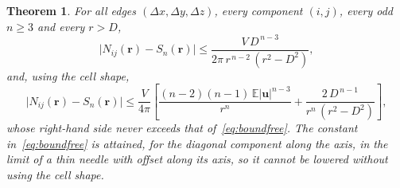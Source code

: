\documentclass[11pt]{amsart}
\theoremstyle{plain}
\newtheorem{theorem}{Theorem}[section]
\theoremstyle{definition}
\theoremstyle{remark}
\begin{document}
\begin{theorem}\label{thm:bound}
For all edges $(\Delta x,\Delta y,\Delta z)$, every component $(i,j)$, every odd
$n\ge 3$ and every $r>D$,
\begin{equation}
  \big|N_{ij}(\mathbf r)-S_n(\mathbf r)\big|
  \le \frac{V\,D^{\,n-3}}{2\pi\, r^{\,n-2}\,(r^2-D^2)},
  \label{eq:boundfree}
\end{equation}
and, using the cell shape,
\begin{equation}
  \big|N_{ij}(\mathbf r)-S_n(\mathbf r)\big|
  \le \frac{V}{4\pi}\left[\frac{(n-2)(n-1)\,\mathbb E|\mathbf u|^{n-3}}{r^{n}}
  + \frac{2\,D^{\,n-1}}{r^{n}\,(r^2-D^2)}\right],
  \label{eq:boundshape}
\end{equation}
whose right-hand side never exceeds that of~\eqref{eq:boundfree}. The constant
in~\eqref{eq:boundfree} is attained, for the diagonal component along the axis,
in the limit of a thin needle with offset along its axis, so it cannot be lowered
without using the cell shape.
\end{theorem}
\end{document}
